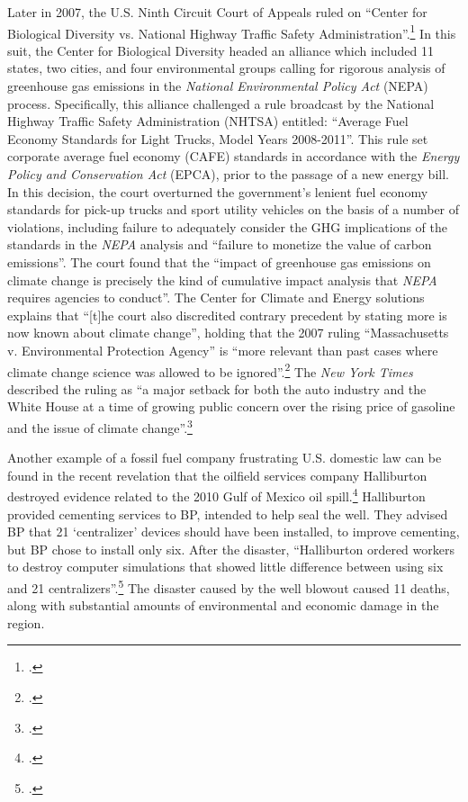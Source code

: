 \documentclass[10pt]{article}
\begin{document}
Later in 2007, the U.S. Ninth Circuit Court of Appeals ruled on ``Center for Biological Diversity vs. National Highway Traffic Safety Administration''.\footcite[][]{9thcircuitHighway}
In this suit, the Center for Biological Diversity headed an alliance which included 11 states, two cities, and four environmental groups calling for rigorous analysis of greenhouse gas emissions in the \emph{National Environmental Policy Act} (NEPA) process. 
Specifically, this alliance challenged a rule broadcast by the National Highway Traffic Safety Administration (NHTSA) entitled: ``Average Fuel Economy Standards for Light Trucks, Model Years 2008-2011''.
This rule set corporate average fuel economy (CAFE) standards in accordance with the \emph{Energy Policy and Conservation Act} (EPCA), prior to the passage of a new energy bill.  
In this decision, the court overturned the government's lenient fuel economy standards for pick-up trucks and sport utility vehicles on the basis of a number of violations, including failure to adequately consider the GHG implications of the standards in the \emph{NEPA} analysis and ``failure to monetize the value of carbon emissions''.
The court found that the ``impact of greenhouse gas emissions on climate change is precisely the kind of cumulative impact analysis that \emph{NEPA} requires agencies to conduct''.
The Center for Climate and Energy solutions explains that ``[t]he court also discredited contrary precedent by stating more is now known about climate change'', holding that the 2007 ruling ``Massachusetts v. Environmental Protection Agency'' is ``more relevant than past cases where climate change science was allowed to be ignored''.\footcite[][]{NEPACases}
The \emph{New York Times} described the ruling as ``a major setback for both the auto industry and the White House at a time of growing public concern over the rising price of gasoline and the issue of climate change''.\footcite[][]{CourtRejectsTruckStandards}



Another example of a fossil fuel company frustrating U.S. domestic law can be found in the recent revelation that the oilfield services company Halliburton destroyed evidence related to the 2010 Gulf of Mexico oil spill.\footcite[][]{Halliburton2013}
Halliburton provided cementing services to BP, intended to help seal the well.
They advised BP that 21 `centralizer' devices should have been installed, to improve cementing, but BP chose to install only six.
After the disaster, ``Halliburton ordered workers to destroy computer simulations that showed little difference between using six and 21 centralizers''.\footcite[][]{Halliburton2013}
The disaster caused by the well blowout caused 11 deaths, along with substantial amounts of environmental and economic damage in the region.
\end{document}
